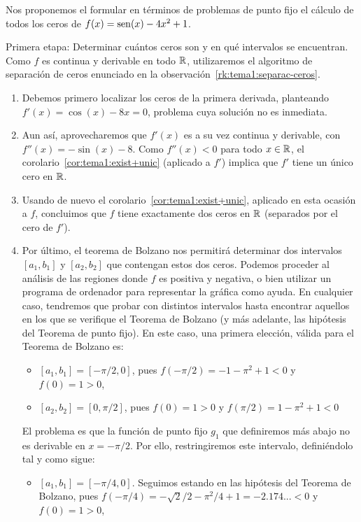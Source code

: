 \begin{example}
  Nos proponemos el formular en términos de problemas de punto fijo el
  cálculo de todos los ceros de $f(x)=\operatorname{sen}(x)-4x^2+1$. 

  
  \textsf{Primera etapa:} Determinar cuántos ceros son y en qué
  intervalos se encuentran. Como $f$ es continua y derivable en todo
  $\operatorname{{\mathbb R}}$, utilizaremos el algoritmo de separación de ceros enunciado
  en la observación~\ref{rk:tema1:separac-ceros}.
  \begin{enumerate}
  \item Debemos primero localizar los ceros de la primera
    derivada, planteando $f'(x)=\cos(x)-8x=0$, problema cuya solución
    no es inmediata.
  \item Aun así, aprovecharemos que $f'(x)$ es a su vez continua y
    derivable, con $f''(x)=-\sin(x)-8$. Como $f''(x)<0$ para todo
    $x\in\operatorname{{\mathbb R}}$, el corolario~\ref{cor:tema1:exist+unic} (aplicado a
    $f'$) implica que $f'$ tiene un único cero en $\operatorname{{\mathbb R}}$.
  \item Usando de nuevo el
    corolario~\ref{cor:tema1:exist+unic}, aplicado en esta ocasión a
    $f$, concluimos que $f$ tiene exactamente dos ceros en $\operatorname{{\mathbb R}}$
    (separados por el cero de $f'$).
  \item Por último, el teorema de Bolzano nos permitirá determinar dos
    intervalos $[a_1,b_1]$ y $[a_2,b_2]$ que contengan estos dos
    ceros. Podemos proceder al análisis de las regiones donde $f$ es
    positiva y negativa, o bien utilizar un programa de ordenador para
    representar la gráfica como ayuda. En cualquier caso, tendremos
    que probar con distintos intervalos hasta encontrar aquellos en
    los que se verifique el Teorema de Bolzano (y más adelante, las
    hipótesis del Teorema de punto fijo). En este caso, una primera
    elección, válida para el Teorema de Bolzano es:
    \begin{itemize}
    \item $[a_1,b_1]=[-\pi/2, 0]$, pues $f(-\pi/2)=-1-\pi^2+1<0$ y
      $f(0)=1>0$,
    \item $[a_2,b_2]=[0, \pi/2]$, pues $f(0)=1>0$ y $f(\pi/2)= 1-\pi^2+1<0$
    \end{itemize}
    El problema es que la función de punto fijo $g_1$ que definiremos
    más abajo no es derivable en $x=-\pi/2$. Por ello, restringiremos
    este intervalo, definiéndolo tal y como sigue:
    \begin{itemize}
    \item $[a_1,b_1]=[-\pi/4, 0]$. Seguimos estando en las hipótesis
      del Teorema de Bolzano, pues $f(-\pi/4)=
      -\sqrt{2}/2-\pi^2/4+1=-2.174...<0$ y $f(0)=1>0$,
    \end{itemize}
  \end{enumerate}


\end{example}
